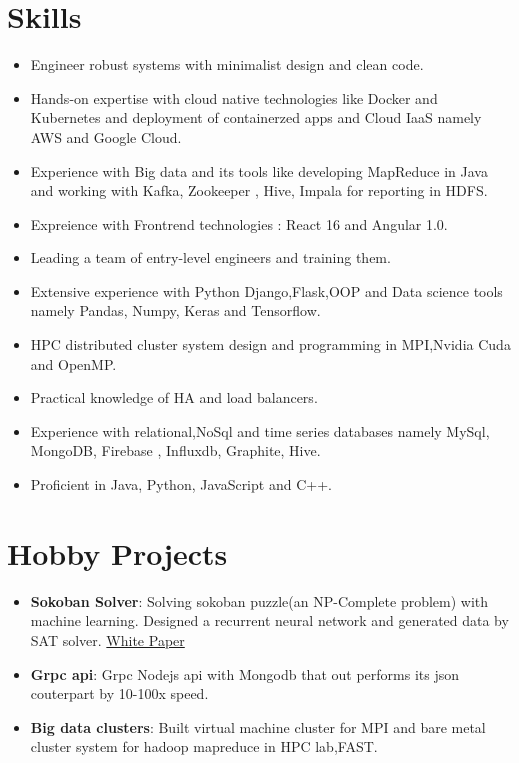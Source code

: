 \documentclass[letterpaper,11pt]{article}
\newcommand{\resumeItem}[2]{
  \item\small{
    \textbf{#1}{: #2 \vspace{-2pt}}
  }
}
\newcommand{\resumeSubItem}[2]{\resumeItem{#1}{#2}\vspace{-4pt}}
\newcommand{\resumeSubHeadingListStart}{\begin{itemize}[leftmargin=*]}
\newcommand{\resumeSubHeadingListEnd}{\end{itemize}}
\begin{document}
\section{Skills}
\resumeSubHeadingListStart
\item
{Engineer robust systems with minimalist design and clean code.}
\item
{Hands-on expertise with cloud native technologies like Docker and Kubernetes and deployment of containerzed apps and Cloud IaaS namely AWS and Google Cloud.}
\item
{Experience with Big data and its tools like developing MapReduce in Java and working with Kafka, Zookeeper , Hive, Impala for reporting in HDFS.}
\item{
Expreience with Frontrend technologies : React 16 and Angular 1.0.
}
\item{
	Leading a team of entry-level engineers and training them.
}
\item{
Extensive experience with Python Django,Flask,OOP and Data science tools namely Pandas, Numpy, Keras and Tensorflow.
}
\item
{HPC distributed cluster system design and programming in MPI,Nvidia Cuda and OpenMP.}
\item{
Practical knowledge of HA and load balancers.}
\item{
Experience with relational,NoSql and time series databases namely MySql, MongoDB, Firebase , Influxdb, Graphite, Hive.
}
\item {
	{Proficient in Java, Python, JavaScript and C++.}
}
\resumeSubHeadingListEnd



\section{Hobby Projects}
  \resumeSubHeadingListStart
      \resumeSubItem{Sokoban Solver}
  {Solving sokoban puzzle(an NP-Complete problem) with machine learning. Designed a recurrent neural network and generated data by SAT solver. \href {http://thesai.org/Downloads/Volume8No3/Paper_64-Generation_of_Sokoban_Stages_using_Recurrent.pdf}{White Paper}} 
	\resumeSubItem{Grpc api}
	{Grpc Nodejs api with Mongodb that out performs its json couterpart by 10-100x speed.}

    \resumeSubItem{Big data clusters}
      {Built virtual machine cluster for MPI and bare metal cluster system for hadoop mapreduce in HPC lab,FAST.}
  \resumeSubHeadingListEnd

%


\end{document}
